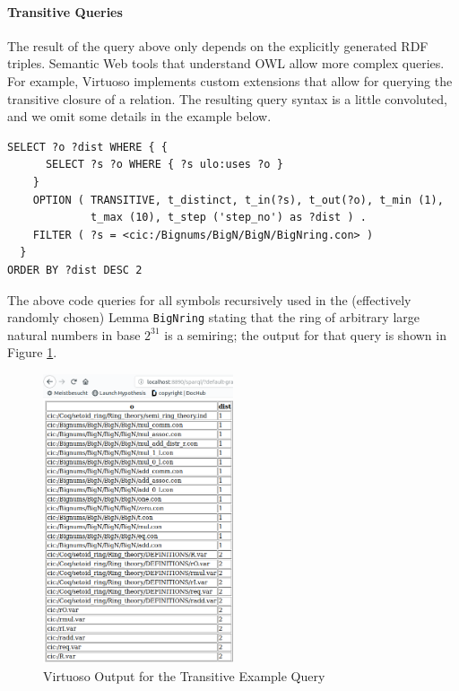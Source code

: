 
\paragraph{Transitive Queries} The result of the query above only depends on the explicitly generated RDF triples. Semantic Web tools that understand OWL allow more complex queries. %
For example, Virtuoso implements custom extensions that allow for querying the transitive closure of a relation. The resulting query syntax is a little convoluted, and we omit some details in the example below.
\begin{lstlisting}
SELECT ?o ?dist WHERE { {
      SELECT ?s ?o WHERE { ?s ulo:uses ?o }
    }
    OPTION ( TRANSITIVE, t_distinct, t_in(?s), t_out(?o), t_min (1),
             t_max (10), t_step ('step_no') as ?dist ) .
    FILTER ( ?s = <cic:/Bignums/BigN/BigN/BigNring.con> )
  }
ORDER BY ?dist DESC 2
\end{lstlisting}
The above code queries for all symbols recursively used in the (effectively randomly chosen) Lemma \texttt{BigNring} stating that the ring of arbitrary large natural numbers in base $2^{31}$ is a semiring; the output for that query is shown in Figure \ref{fig:query2}.


\begin{figure}[ht]\centering
\includegraphics[width=0.5\textwidth]{ulo_queryresult2}
\caption{Virtuoso Output for the Transitive Example Query}\label{fig:query2}
\end{figure}

